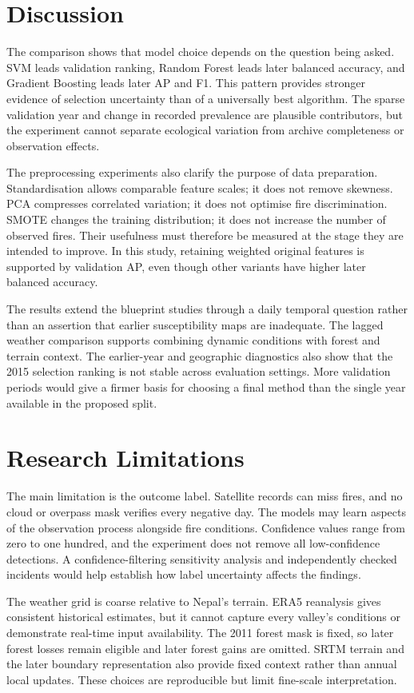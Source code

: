 \documentclass[conference,a4paper]{IEEEtran}
\begin{document}
\section{Discussion}
The comparison shows that model choice depends on the question being asked. SVM leads validation ranking, Random Forest leads later balanced accuracy, and Gradient Boosting leads later AP and F1. This pattern provides stronger evidence of selection uncertainty than of a universally best algorithm. The sparse validation year and change in recorded prevalence are plausible contributors, but the experiment cannot separate ecological variation from archive completeness or observation effects.

The preprocessing experiments also clarify the purpose of data preparation. Standardisation allows comparable feature scales; it does not remove skewness. PCA compresses correlated variation; it does not optimise fire discrimination. SMOTE changes the training distribution; it does not increase the number of observed fires. Their usefulness must therefore be measured at the stage they are intended to improve. In this study, retaining weighted original features is supported by validation AP, even though other variants have higher later balanced accuracy.

The results extend the blueprint studies through a daily temporal question rather than an assertion that earlier susceptibility maps are inadequate. The lagged weather comparison supports combining dynamic conditions with forest and terrain context. The earlier-year and geographic diagnostics also show that the 2015 selection ranking is not stable across evaluation settings. More validation periods would give a firmer basis for choosing a final method than the single year available in the proposed split.

\section{Research Limitations}
The main limitation is the outcome label. Satellite records can miss fires, and no cloud or overpass mask verifies every negative day. The models may learn aspects of the observation process alongside fire conditions. Confidence values range from zero to one hundred, and the experiment does not remove all low-confidence detections. A confidence-filtering sensitivity analysis and independently checked incidents would help establish how label uncertainty affects the findings.

The weather grid is coarse relative to Nepal's terrain. ERA5 reanalysis gives consistent historical estimates, but it cannot capture every valley's conditions or demonstrate real-time input availability. The 2011 forest mask is fixed, so later forest losses remain eligible and later forest gains are omitted. SRTM terrain and the later boundary representation also provide fixed context rather than annual local updates. These choices are reproducible but limit fine-scale interpretation.
\end{document}
